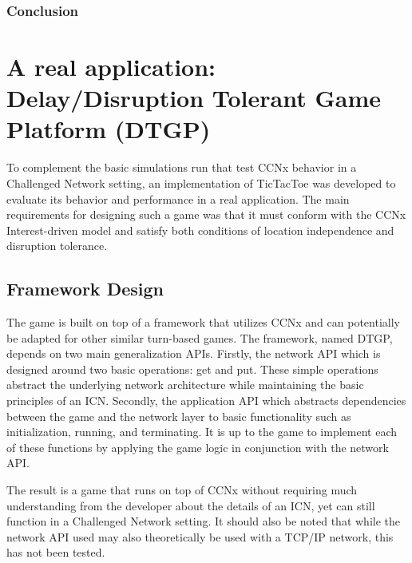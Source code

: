 \documentclass[a4paper,12pt]{report}      %
\begin{document}

\subsection{Conclusion}


\pagebreak
\chapter{A real application: Delay/Disruption Tolerant Game Platform (DTGP)}

To complement the basic simulations run that test CCNx behavior in a Challenged Network setting, an
implementation of TicTacToe was developed to evaluate its behavior and performance in a real
application. The main requirements for designing such a game was that it must conform with the
CCNx Interest-driven model and satisfy both conditions of location independence and disruption
tolerance.

\section{Framework Design}

The game is built on top of a framework that utilizes CCNx and can potentially be adapted for other
similar turn-based games. The framework, named DTGP, depends on two main generalization APIs.
Firstly, the network API which is designed around two basic operations: get and put. These simple
operations abstract the underlying network architecture while maintaining the basic principles of an
ICN. Secondly, the application API which abstracts dependencies between the game and the
network layer to basic functionality such as initialization, running, and terminating. It is up to the game
to implement each of these functions by applying the game logic in conjunction with the network API.

The result is a game that runs on top of CCNx without requiring much understanding from the
developer about the details of an ICN, yet can still function in a Challenged Network setting. It should
also be noted that while the network API used may also theoretically be used with a TCP/IP network,
this has not been tested.
\end{document}
